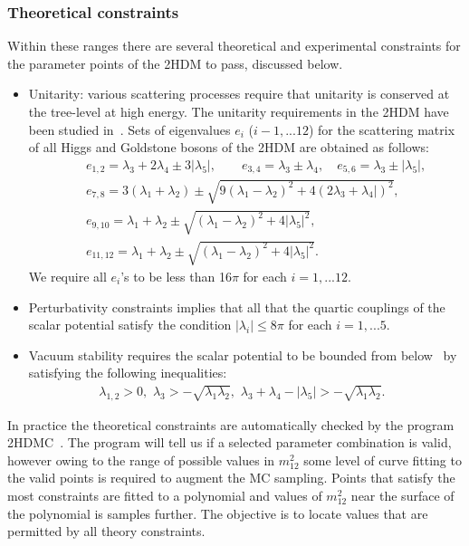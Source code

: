 \subsubsection{Theoretical constraints}
Within these ranges there are several theoretical and experimental constraints for the parameter points of the 2HDM to pass, discussed below.	
\begin{itemize}
	\item Unitarity: various scattering processes  require that unitarity is conserved at the tree-level at high energy.
    The unitarity requirements in the 2HDM have been studied in~\cite{Kanemura:1993hm, Akeroyd:2000wc, Arhrib:2000is}.
	Sets of eigenvalues $e_i$ ($i-1, ... 12$) for the scattering  matrix of all Higgs and Goldstone bosons of the 2HDM are obtained as follows:
	\begin{eqnarray}
	&& e_{1,2} =  \lambda_3+2\lambda_4\pm 3 | \lambda_5| , \quad  \quad  e_{3,4} = \lambda_3\pm\lambda_4 , \quad e_{5,6} =  \lambda_3\pm|\lambda_5|,  \nonumber \\
	&&
	e_{7,8} = 3(\lambda_1+\lambda_2)\pm\sqrt{9(\lambda_1-\lambda_2)^2+4(2\lambda_3+\lambda_4|)^2},  \nonumber \\
	&&
	e_{9,10} = \lambda_1+\lambda_2\pm\sqrt{(\lambda_1-\lambda_2)^2+4|\lambda_5|^2},  \nonumber \\
	&&
	e_{11,12}  = \lambda_1+\lambda_2\pm\sqrt{(\lambda_1-\lambda_2)^2+4|\lambda_5|^2}.
	\end{eqnarray}
    We require all \(e_i\)'s to be less than 16\(\pi\) for each \(i=1,...12\).
\item Perturbativity constraints \cite{Kanemura:1993hm,Branco:2011iw} implies that all that the quartic couplings of the scalar potential satisfy the condition \(|\lambda_i| \leqslant 8 \pi\) for each \(i=1,...5\).
	
	\item Vacuum stability requires the scalar potential to be bounded from below~\cite{Gunion:2002zf} by satisfying the following inequalities:
	\begin{eqnarray}
	\lambda_{1,2}>0,  \,\,
	\lambda_3>- \sqrt{\lambda_1\lambda_2}, \,\,
	\lambda_3+\lambda_4-|\lambda_5|> - \sqrt{\lambda_1\lambda_2}.~~~
	\end{eqnarray}
	
\end{itemize}
In practice the theoretical constraints are automatically checked by the program 2HDMC~\cite{Eriksson:2009ws}.
The program will tell us if a selected parameter combination is valid,
however owing to the range of possible values in \(m_{12}^2\) some level of curve fitting to the valid points
is required to augment the MC sampling.
Points that satisfy the most constraints are fitted to a polynomial and
values of \(m_{12}^2\) near the surface of the polynomial is samples further.
The objective is to locate values that are permitted by all theory constraints.

